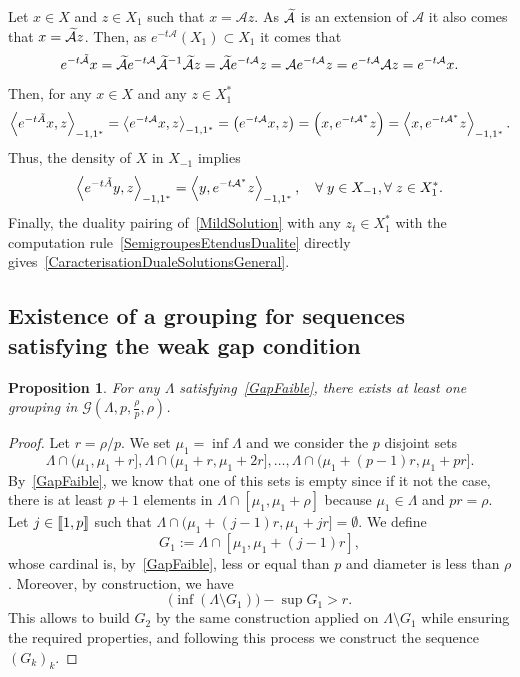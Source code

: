 \documentclass[11pt]{article}
\newtheorem{prop}[theo]{Proposition}
\theoremstyle{definition}
\numberwithin{equation}{section}
\numberwithin{figure}{section}
\numberwithin{table}{section}
\newcommand{\llbracket}{\mathopen{[\mkern -2.7mu[}}
\newcommand{\rrbracket}{\mathclose{]\mkern -2.7mu]}}
\newcommand{\inter}[2]{\llbracket #1,#2 \rrbracket}
\newcommand\A{\mathcal{A}}
\newcommand\As{\mathcal{A}^*}
\newcommand{\Xun}{X_1}
\newcommand{\Xuns}{X_1^*}
\newcommand{\Xmun}{X_{-1}}
\newcommand{\psX}[2]{\left(#1, #2 \right)}
\newcommand{\dualX}[2]{\left\langle #1, #2 \right\rangle_{-1,1^*}}
\let\oldtilde\tilde
\renewcommand*{\tilde}[1]{\mathchoice{\widetilde{#1}}{\widetilde{#1}}{\oldtilde{#1}}{\oldtilde{#1}}}\let\oldexists\exists
\renewcommand*{\exists}{\mathrel{\oldexists}}
\let\oldforall\forall
\renewcommand*{\forall}{\mathrel{\oldforall}}
\begin{document}
Let $x \in X$ and $z \in \Xun$ such that $x= \A z$. As $\tilde{\A}$ is an extension of $\A$ it also comes that $x = \tilde{\A}z$. Then, as $e^{-t \A} (\Xun) \subset \Xun$ it comes that
\[
e^{-t \tilde{\A}}x = \tilde{\A} e^{-t \A} \tilde{\A}^{-1} \tilde{\A} z = \tilde{\A} e^{-t \A} z = \A e^{-t \A} z = e^{-t \A} \A z = e^{-t \A}x.
\]
Then, for any $x \in X$ and any $z \in \Xuns$
\[
\dualX{e^{-t \tilde{A}} x }{z} = \dualX{e^{-t\A} x}{z} = \psX{e^{-t\A}x}{z} = \psX{x}{e^{-t \As} z} = \dualX{x}{e^{-t \As}z}.
\]
Thus, the density of $X$ in $\Xmun$ implies
\begin{equation}\label{SemigroupesEtendusDualite}
\dualX{e^{-t \tilde{A}} y }{z} = \dualX{y}{e^{-t \As}z}, \quad \forall y \in \Xmun, \forall z \in \Xuns.
\end{equation}
Finally, the duality pairing of~\eqref{MildSolution} with any $z_t \in \Xuns$ with the computation rule~\eqref{SemigroupesEtendusDualite} directly gives~\eqref{CaracterisationDualeSolutionsGeneral}.


\subsection{Existence of a grouping for sequences satisfying the weak gap condition}

\begin{prop}\label{Prop:Groupements}
For any $\Lambda$ satisfying~\eqref{GapFaible}, there exists at least one grouping in $\mathcal{G} \left(\Lambda, p,\frac{\rho}{p},\rho \right)$.
\end{prop}

\begin{proof}
Let $r=\rho/p$. We set $\mu_1=\inf \Lambda$ and we consider the $p$ disjoint sets
\[
\Lambda\cap (\mu_1,\mu_1+r], \Lambda\cap (\mu_1+r,\mu_1+2r], \dotsc, \Lambda\cap (\mu_1+(p-1)r,\mu_1+pr].
\]
By~\eqref{GapFaible}, we know that one of this sets is empty since if it not the case, there is at least $p+1$ elements in $\Lambda\cap [\mu_1,\mu_1+\rho]$ because $\mu_1\in \Lambda$ and $pr=\rho$. Let $j\in \inter{1}{p}$ such that $\Lambda\cap (\mu_1+(j-1)r,\mu_1+jr]= \emptyset$. We define
\[
G_1:=\Lambda\cap [\mu_1, \mu_1+(j-1)r],
\]
whose cardinal is, by~\eqref{GapFaible}, less or equal than $p$ and diameter is less than $\rho$. Moreover, by construction, we have
\[
\big(\inf (\Lambda\setminus G_1) \big) - \sup G_1 > r.
\]
This allows to build $G_2$ by the same construction applied on $\Lambda\setminus G_1$ while ensuring the required properties, and following this process we construct the sequence $(G_k)_k$.
\end{proof}
\end{document}
